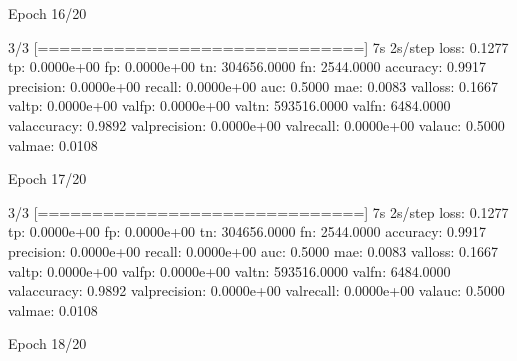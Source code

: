 \documentclass[letterpaper,10pt,english]{sphinxmanual}
\begin{document}
\begin{sphinxVerbatim}[commandchars=\\\{\}]
Epoch 16/20
\end{sphinxVerbatim}

\begin{sphinxVerbatim}[commandchars=\\\{\}]
3/3 [==============================] \PYGZhy{} 7s 2s/step \PYGZhy{} loss: 0.1277 \PYGZhy{} tp: 0.0000e+00 \PYGZhy{} fp: 0.0000e+00 \PYGZhy{} tn: 304656.0000 \PYGZhy{} fn: 2544.0000 \PYGZhy{} accuracy: 0.9917 \PYGZhy{} precision: 0.0000e+00 \PYGZhy{} recall: 0.0000e+00 \PYGZhy{} auc: 0.5000 \PYGZhy{} mae: 0.0083 \PYGZhy{} val\PYGZus{}loss: 0.1667 \PYGZhy{} val\PYGZus{}tp: 0.0000e+00 \PYGZhy{} val\PYGZus{}fp: 0.0000e+00 \PYGZhy{} val\PYGZus{}tn: 593516.0000 \PYGZhy{} val\PYGZus{}fn: 6484.0000 \PYGZhy{} val\PYGZus{}accuracy: 0.9892 \PYGZhy{} val\PYGZus{}precision: 0.0000e+00 \PYGZhy{} val\PYGZus{}recall: 0.0000e+00 \PYGZhy{} val\PYGZus{}auc: 0.5000 \PYGZhy{} val\PYGZus{}mae: 0.0108
\end{sphinxVerbatim}

\begin{sphinxVerbatim}[commandchars=\\\{\}]
Epoch 17/20
\end{sphinxVerbatim}

\begin{sphinxVerbatim}[commandchars=\\\{\}]
3/3 [==============================] \PYGZhy{} 7s 2s/step \PYGZhy{} loss: 0.1277 \PYGZhy{} tp: 0.0000e+00 \PYGZhy{} fp: 0.0000e+00 \PYGZhy{} tn: 304656.0000 \PYGZhy{} fn: 2544.0000 \PYGZhy{} accuracy: 0.9917 \PYGZhy{} precision: 0.0000e+00 \PYGZhy{} recall: 0.0000e+00 \PYGZhy{} auc: 0.5000 \PYGZhy{} mae: 0.0083 \PYGZhy{} val\PYGZus{}loss: 0.1667 \PYGZhy{} val\PYGZus{}tp: 0.0000e+00 \PYGZhy{} val\PYGZus{}fp: 0.0000e+00 \PYGZhy{} val\PYGZus{}tn: 593516.0000 \PYGZhy{} val\PYGZus{}fn: 6484.0000 \PYGZhy{} val\PYGZus{}accuracy: 0.9892 \PYGZhy{} val\PYGZus{}precision: 0.0000e+00 \PYGZhy{} val\PYGZus{}recall: 0.0000e+00 \PYGZhy{} val\PYGZus{}auc: 0.5000 \PYGZhy{} val\PYGZus{}mae: 0.0108
\end{sphinxVerbatim}

\begin{sphinxVerbatim}[commandchars=\\\{\}]
Epoch 18/20
\end{sphinxVerbatim}
\end{document}
